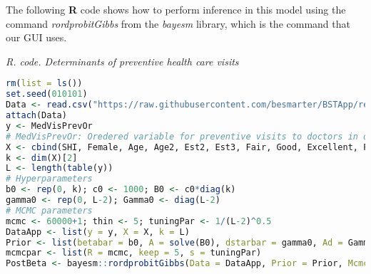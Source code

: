 The following \textbf{R} code shows how to perform inference in this model using the command \textit{rordprobitGibbs} from the \textit{bayesm} library, which is the command that our GUI uses.

\begin{tcolorbox}[enhanced,width=4.67in,center upper,
	fontupper=\large\bfseries,drop shadow southwest,sharp corners]
	\textit{R. code. Determinants of preventive health care visits}
	\begin{VF}
		\begin{lstlisting}[language=R]		
rm(list = ls())
set.seed(010101)
Data <- read.csv("https://raw.githubusercontent.com/besmarter/BSTApp/refs/heads/master/DataApp/2HealthMed.csv", sep = ",", header = TRUE, quote = "")
attach(Data)
y <- MedVisPrevOr 
# MedVisPrevOr: Oredered variable for preventive visits to doctors in one year: 1 (none), 2 (once), ... 6 (five or more)
X <- cbind(SHI, Female, Age, Age2, Est2, Est3, Fair, Good, Excellent, PriEd, HighEd, VocEd, UnivEd)
k <- dim(X)[2]
L <- length(table(y))
# Hyperparameters
b0 <- rep(0, k); c0 <- 1000; B0 <- c0*diag(k)
gamma0 <- rep(0, L-2); Gamma0 <- diag(L-2)
# MCMC parameters
mcmc <- 60000+1; thin <- 5; tuningPar <- 1/(L-2)^0.5
DataApp <- list(y = y, X = X, k = L)
Prior <- list(betabar = b0, A = solve(B0), dstarbar = gamma0, Ad = Gamma0)
mcmcpar <- list(R = mcmc, keep = 5, s = tuningPar)
PostBeta <- bayesm::rordprobitGibbs(Data = DataApp, Prior = Prior, Mcmc = mcmcpar)
\end{lstlisting}
	\end{VF}
\end{tcolorbox} 

